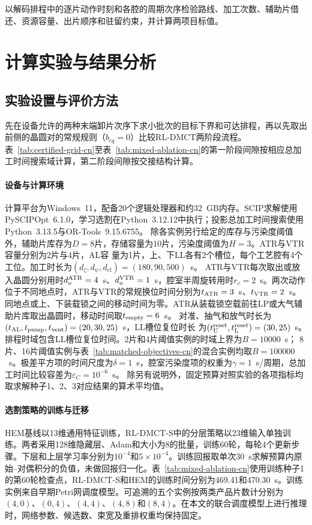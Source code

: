 \documentclass[preprint,12pt,nonatbib]{elsarticle}
\begin{document}
以解码排程中的逐片动作时刻和各腔的周期次序检验路线、加工次数、辅助片借还、资源容量、出片顺序和驻留约束，并计算两项目标值。

\section{计算实验与结果分析}
\label{sec:experiments-cn}

\subsection{实验设置与评价方法}
\label{sec:experiment-settings-cn}

先在设备允许的两种末端卸片次序下求小批次的目标下界和可达排程，再以先取出前侧的晶圆对的常规规则（$b_{cq}=0$）比较RL-DMCT两阶段流程。表~\ref{tab:certified-grid-cn}至表~\ref{tab:mixed-ablation-cn}的第一阶段间隙按相应总加工时间搜索域计算，第二阶段间隙按交接结构计算。

\paragraph{设备与计算环境}
计算平台为Windows~11，配备20个逻辑处理器和约32~GB内存。SCIP求解使用PySCIPOpt~6.1.0，学习选割在Python~3.12.12中执行；投影总加工时间搜索使用Python~3.13.5与OR-Tools~9.15.6755。
除各实例另行给定的库存与污染度阈值外，辅助片库存为$D=8$片，存储容量为10片，污染度阈值为$H=3$。ATR与VTR容量分别为2片与4片，AL容
量为1片，上、下LL各有2个槽位，每个工艺腔有4个工位。加工时长为$(d_\zeta,d_\psi,d_{\mathrm{cl}})=(180,90,500)$~s。
ATR与VTR每次取出或放入晶圆分别用时$d_o^{\rm ATR}=4$~s、$d_o^{\rm VTR}=1$~s，腔室半周旋转用时$r_c=2$~s。两次动作位于不同地点时，ATR与VTR的常规换位时间分别为$t_{\rm ATR}=3$~s、$t_{\rm VTR}=2$~s。同地点或上、下装载锁之间的移动时间为零。ATR从装载锁空载前往LP或大气辅助片库取出晶圆时，移动时间取$t_{\rm empty}=6$~s。
对准、抽气和放气时长为$(t_{\rm AL},t_{\rm pump},t_{\rm vent})=(20,30,25)$~s，LL槽位复位时长
为$(t_{\rm U}^{\rm reset},t_{\rm L}^{\rm reset})=(30,25)$~s。排程时域包含LL槽位复位时间。2片和4片阈值实例的时域上界为$B=10000$~s；
8片、16片阈值实例与表~\ref{tab:matched-objectives-cn}的混合实例均取$B=100000$~s。极差平方项的时间尺度为$\delta=1$~s，腔室污染度项的权重为$\gamma=1$~s/周期，总加工时间比较容差为$\varepsilon_C=10^{-6}$~s。
除另有说明外，固定预算对照实验的各项指标均取求解种子1、2、3对应结果的算术平均值。


\paragraph{选割策略的训练与迁移}
HEM基线以13维通用特征训练，RL-DMCT-S中的分层策略以23维输入单独训练。两者采用128维隐藏层、Adam和大小为8的批量，训练60轮，每轮4个更新步骤。下层和上层学习率分别为$10^{-4}$和$5\times10^{-4}$。训练回报取单次30~s求解预算内原始--对偶积分的负值，未做回报归一化。表~\ref{tab:mixed-ablation-cn}使用训练种子1的第60轮检查点，RL-DMCT-S和HEM的训练时间分别为469.41和470.30~s。训练实例来自早期Petri网调度模型。可追溯的五个实例按两类产品片数计分别为$(4,0)$、$(0,4)$、$(4,4)$、$(4,8)$和$(8,4)$。在本文的联合调度模型上进行推理时，网络参数、候选数、束宽及重排权重均保持固定。
\end{document}
